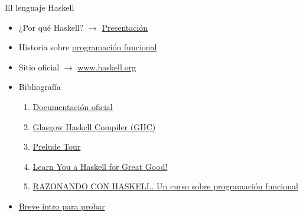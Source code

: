 \begin{frame}{El lenguaje Haskell}
\begin{itemize}
    \item ¿Por qué Haskell? $\rightarrow$ \href{https://es.slideshare.net/RevistaSG/programacin-funcional-con-haskell}{Presentación}
    \item Historia sobre \href{https://es.slideshare.net/JosLuisGarcaHernndez/historia-de-la-programacion-funcional}{programación funcional}
    \item Sitio oficial $\rightarrow$ \href{www.haskell.org}{www.haskell.org}
    \item Bibliografía
    \begin{enumerate}
        \item \href{https://www.haskell.org/documentation/}{Documentación oficial}
        \item \href{https://downloads.haskell.org/~ghc/latest/docs/html/users_guide/index.html}{Glasgow Haskell Compiler (GHC)}
        \item \href{https://www.cse.chalmers.se/edu/year/2017/course/TDA452/Haskell-Prelude-Tour-A4.pdf}{Prelude Tour}
        \item \href{http://learnyouahaskell.com/}{Learn You a Haskell for Great Good!}
        \item \href{http://www.lcc.uma.es/~pepeg/pfHaskell/index.html}{RAZONANDO CON HASKELL. Un curso sobre programación funcional }
    \end{enumerate}
    \item \href{https://tryhaskell.org/}{Breve intro para probar}
\end{itemize}
\end{frame}
